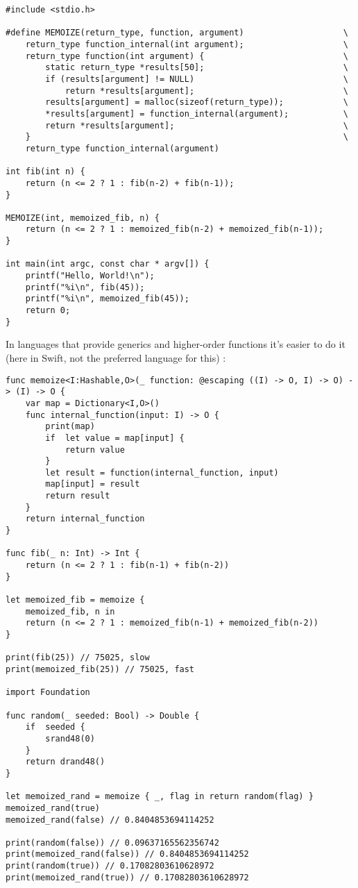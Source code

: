 \documentclass[]{article}
\begin{document}
\begin{verbatim}
#include <stdio.h>

#define MEMOIZE(return_type, function, argument)                    \
    return_type function_internal(int argument);                    \
    return_type function(int argument) {                            \
        static return_type *results[50];                            \
        if (results[argument] != NULL)                              \
            return *results[argument];                              \
        results[argument] = malloc(sizeof(return_type));            \
        *results[argument] = function_internal(argument);           \
        return *results[argument];                                  \
    }                                                               \
    return_type function_internal(argument)

int fib(int n) {
    return (n <= 2 ? 1 : fib(n-2) + fib(n-1));
}

MEMOIZE(int, memoized_fib, n) {
    return (n <= 2 ? 1 : memoized_fib(n-2) + memoized_fib(n-1));
}

int main(int argc, const char * argv[]) {
    printf("Hello, World!\n");
    printf("%i\n", fib(45));
    printf("%i\n", memoized_fib(45));
    return 0;
}
\end{verbatim}

\noindent In languages that provide generics and higher-order functions it's easier to do it (here in Swift, not the preferred language for this) :

\begin{verbatim}
func memoize<I:Hashable,O>(_ function: @escaping ((I) -> O, I) -> O) -> (I) -> O {
    var map = Dictionary<I,O>()
    func internal_function(input: I) -> O {
        print(map)
        if  let value = map[input] {
            return value
        }
        let result = function(internal_function, input)
        map[input] = result
        return result
    }
    return internal_function
}

func fib(_ n: Int) -> Int {
    return (n <= 2 ? 1 : fib(n-1) + fib(n-2))
}

let memoized_fib = memoize {
    memoized_fib, n in
    return (n <= 2 ? 1 : memoized_fib(n-1) + memoized_fib(n-2))
}

print(fib(25)) // 75025, slow
print(memoized_fib(25)) // 75025, fast

import Foundation

func random(_ seeded: Bool) -> Double {
    if  seeded {
        srand48(0)
    }
    return drand48()
}

let memoized_rand = memoize { _, flag in return random(flag) }
memoized_rand(true)
memoized_rand(false) // 0.8404853694114252

print(random(false)) // 0.09637165562356742
print(memoized_rand(false)) // 0.8404853694114252
print(random(true)) // 0.17082803610628972
print(memoized_rand(true)) // 0.17082803610628972
\end{verbatim}
\end{document}
